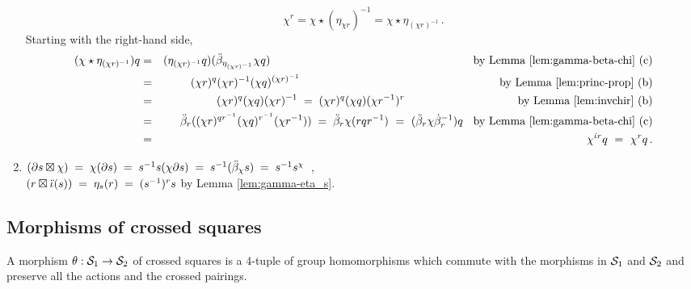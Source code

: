 \begin{example}
\begin{enumerate}[{\rm (a)}]
$$\chi^r = \chi \star (\eta_{\chi r})^{-1} = \chi \star \eta_{(\chi r)^{-1}}\,.
$$
Starting with the right-hand side, 
\begin{eqnarray*}
(\chi \star \eta_{(\chi r)^{-1}})q
 & = & (\eta_{(\chi r)^{-1}}q)(\ddb_{\eta_{(\chi r)^{-1}}} \chi q) 
        \hspace{62mm} \mbox{ by Lemma \ref{lem:gamma-beta-chi} (c)} \\
 & = & (\chi r)^q (\chi r)^{-1} (\chi q)^{(\chi r)^{-1}} 
        \hspace{61mm} \mbox{ by Lemma \ref{lem:princ-prop} (b)} \\
 & = & (\chi r)^q (\chi q) (\chi r)^{-1} 
 \;=\; (\chi r)^q (\chi q) (\chi r^{-1})^r 
        \hspace{34mm} \mbox{ by Lemma \ref{lem:invchir} (b)}    \\
 & = & \ddb_r((\chi r)^{qr^{-1}} (\chi q)^{r^{-1}} (\chi r^{-1})) 
 \;=\; \ddb_r \chi(rqr^{-1})
   ~=~ (\ddb_r\chi\db_r^{-1})q
        \hspace{2mm} \mbox{ by Lemma \ref{lem:gamma-beta-chi} (c)} \\
 & = & \chi^{\di r}q
   ~=~ \chi^r q\,.
\end{eqnarray*}
\item
\quad $(\partial s \boxtimes \chi) 
  \;=\; \chi(\partial s) 
  \;=\; s^{-1} s (\chi\partial s) 
  \;=\; s^{-1} (\ddot{\beta}_{\chi} s) 
  \;=\; s^{-1} s^{\chi}$~, \\
\medskip
\hspace*{4mm}$(r \boxtimes \ddot{\iota}(s)) \;=\; \eta_{s}(r) \;=\; (s^{-1})^r s$
  \hspace{74mm} by Lemma \ref{lem:gamma-eta_s}. \\
\end{enumerate}
\end{example}


\newpage
\subsection{Morphisms of crossed squares} 

A morphism $\theta : \mathcal{S}_1 \to \mathcal{S}_2$ of crossed squares 
is a $4$-tuple of group homomorphisms which commute with the
morphisms in $\mathcal{S}_1$ and $\mathcal{S}_2$ and preserve all the actions
and the crossed pairings.

